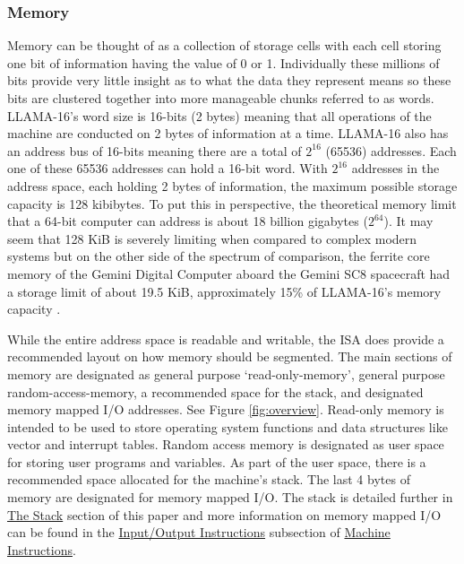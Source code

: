 \documentclass[man,hidelinks,floatsintext]{apa7}
\begin{document}
\subsubsection{Memory}
Memory can be thought of as a collection of storage cells with each cell storing one bit of information having the value of 0 or 1. Individually these millions of bits provide very little insight as to what the data they represent means so these bits are clustered together into more manageable chunks referred to as words. LLAMA-16's word size is 16-bits (2 bytes) meaning that all operations of the machine are conducted on 2 bytes of information at a time. LLAMA-16 also has an address bus of 16-bits meaning there are a total of $2^{16}$ (65536) addresses. Each one of these 65536 addresses can hold a 16-bit word. With $2^{16}$ addresses in the address space, each holding 2 bytes of information, the maximum possible storage capacity is 128 kibibytes. To put this in perspective, the theoretical memory limit that a 64-bit computer can address is about 18 billion gigabytes ($2^{64}$). It may seem that 128 KiB is severely limiting when compared to complex modern systems but on the other side of the spectrum of comparison, the ferrite core memory of the Gemini Digital Computer aboard the Gemini SC8 spacecraft had a storage limit of about 19.5 KiB, approximately 15\% of LLAMA-16's memory capacity \parencite{nasa}.\par
While the entire address space is readable and writable, the ISA does provide a recommended layout on how memory should be segmented. The main sections of memory are designated as general purpose `read-only-memory', general purpose random-access-memory, a recommended space for the stack, and designated memory mapped I/O addresses. See Figure \ref{fig:overview}. Read-only memory is intended to be used to store operating system functions and data structures like vector and interrupt tables. Random access memory is designated as user space for storing user programs and variables. As part of the user space, there is a recommended space allocated for the machine's stack. The last 4 bytes of memory are designated for memory mapped I/O. The stack is detailed further in \hyperref[sec:stack]{The Stack} section of this paper and more information on memory mapped I/O can be found in the \hyperref[sec:io]{Input/Output Instructions} subsection of \hyperref[sec:machineinstr]{Machine Instructions}.
\end{document}
